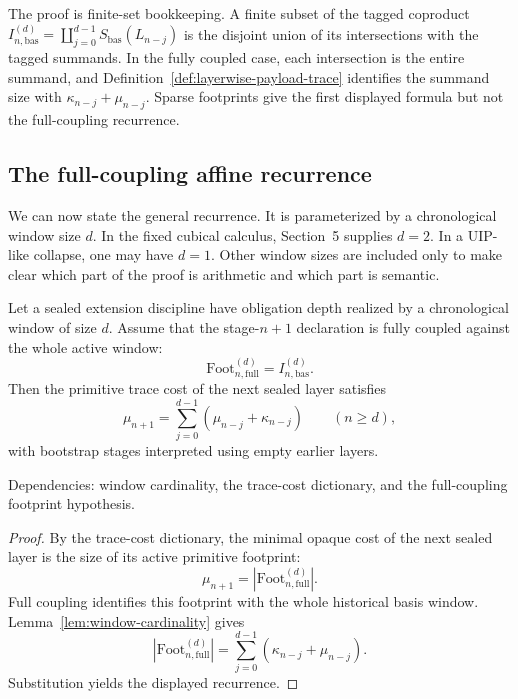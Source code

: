 \documentclass{lmcs}
\begin{document}
The proof is finite-set bookkeeping.  A finite subset of the tagged coproduct
\(I^{(d)}_{n,\mathrm{bas}}=\coprod_{j=0}^{d-1}S_{\mathrm{bas}}(L_{n-j})\) is the disjoint union
of its intersections with the tagged summands.  In the fully coupled case, each intersection is
the entire summand, and Definition~\ref{def:layerwise-payload-trace} identifies the summand
size with \(\kappa_{n-j}+\mu_{n-j}\).  Sparse footprints give the first displayed formula but
not the full-coupling recurrence.

\subsection{The full-coupling affine recurrence}
\label{subsec:full-coupling-recurrence}

We can now state the general recurrence.  It is parameterized by a chronological window size
\(d\).  In the fixed cubical calculus, Section~5 supplies \(d=2\).  In a UIP-like collapse,
one may have \(d=1\).  Other window sizes are included only to make clear which part of the
proof is arithmetic and which part is semantic.

\begin{thm}
\label{thm:full-coupling-affine-recurrence}
Let a sealed extension discipline have obligation depth realized by a chronological window of
size \(d\).  Assume that the stage-\(n+1\) declaration is fully coupled against the whole
active window:
\[
  \mathrm{Foot}^{(d)}_{n,\mathrm{full}} = I^{(d)}_{n,\mathrm{bas}}.
\]
Then the primitive trace cost of the next sealed layer satisfies
\[
  \mu_{n+1}
  =
  \sum_{j=0}^{d-1} (\mu_{n-j}+\kappa_{n-j})
  \qquad (n\geq d),
\]
with bootstrap stages interpreted using empty earlier layers.

Dependencies: window cardinality, the trace-cost dictionary, and the full-coupling footprint
hypothesis.
\end{thm}

\begin{proof}
By the trace-cost dictionary, the minimal opaque cost of the next sealed layer is the size of
its active primitive footprint:
\[
  \mu_{n+1}=|\mathrm{Foot}^{(d)}_{n,\mathrm{full}}|.
\]
Full coupling identifies this footprint with the whole historical basis window.  Lemma~\ref{lem:window-cardinality} gives
\[
  |\mathrm{Foot}^{(d)}_{n,\mathrm{full}}|
  =
  \sum_{j=0}^{d-1} (\kappa_{n-j}+\mu_{n-j}).
\]
Substitution yields the displayed recurrence.
\end{proof}
\end{document}
